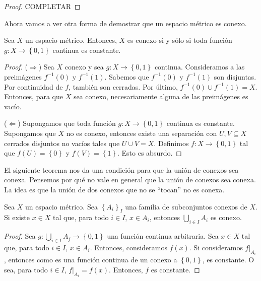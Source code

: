 \begin{proof}
	\color{red} COMPLETAR
\end{proof}

Ahora vamos a ver otra forma de demostrar que un espacio métrico es conexo.

\begin{proposition}
	Sea $X$ un espacio métrico. Entonces, $X$ es conexo si y sólo si toda función $g : X \to \left\{ 0, 1 \right\}$ continua es constante.
\end{proposition}

\begin{proof}
	($\Rightarrow$) Sea $X$ conexo y sea $g : X \to \left\{ 0, 1 \right\}$ continua. Consideramos a las preimágenes $f^{-1}(0)$ y $f^{-1}(1)$. Sabemos que $f^{-1}(0)$ y $f^{-1}(1)$ son disjuntas. Por continuidad de $f$, también son cerradas. Por último, $f^{-1}(0) \cup f^{-1}(1) = X$. Entonces, para que $X$ sea conexo, necesariamente alguna de las preimágenes es vacío.

	($\Leftarrow$) Supongamos que toda función $g : X \to \left\{ 0, 1 \right\}$ continua es constante. Supongamos que $X$ no es conexo, entonces existe una separación con $U, V \subseteq X$ cerrados disjuntos no vacíos tales que $U \cup V = X$. Definimos $f : X \to \left\{ 0, 1 \right\}$ tal que $f(U) = \left\{ 0 \right\}$ y $f(V) = \left\{ 1 \right\}$. Esto es absurdo.
\end{proof}

El siguiente teorema nos da una condición para que la unión de conexos sea conexa. Pensemos por qué no vale en general que la unión de conexos sea conexa. La idea es que la unión de dos conexos que no se ``tocan'' no es conexa.

\begin{center}
	
\end{center}

\begin{theorem}
	Sea $X$ un espacio métrico. Sea $\left\{ A_i \right\}_I$ una familia de subconjuntos conexos de $X$. Si existe $x \in X$ tal que, para todo $i \in I$, $x \in A_i$, entonces $\bigcup_{i \in I} A_i$ es conexo.
\end{theorem}

\begin{proof}
	Sea $g : \bigcup_{i \in I} A_j \to \left\{ 0, 1 \right\}$ una función continua arbitraria. Sea $x \in X$ tal que, para todo $i \in I$, $x \in A_i$. Entonces, consideramos $f(x)$. Si consideramos $f|_{A_i}$, entonces como es una función continua de un conexo a $\left\{ 0, 1 \right\}$, es constante. O sea, para todo $i \in I$, $f|_{A_i} = f(x)$. Entonces, $f$ es constante.
\end{proof}

